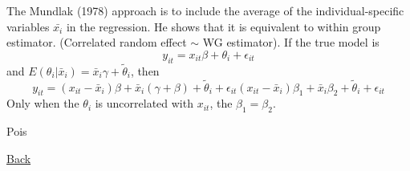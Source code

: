 
\begin{remark}
    The Mundlak (1978) approach is to include the average of the individual-specific variables $\bar{x_i}$ in the regression. He shows that it is equivalent to within group estimator.
    (Correlated random effect $\sim$ WG estimator). If the true model is \begin{equation*}
        y_{it}=x_{it}\beta+\theta_i+\epsilon_{it}
    \end{equation*} and $E(\theta_i|\bar{x}_i)=\bar{x}_i\gamma+\tilde{\theta}_i$, then
    \begin{equation*}
        y_{it}=(x_{it}-\bar{x}_i)\beta+\bar{x}_i(\gamma+\beta)+\tilde{\theta}_i+\epsilon_{it}
        (x_{it}-\bar{x}_i)\beta_1+\bar{x}_i\beta_2+\tilde{\theta}_i+\epsilon_{it}
    \end{equation*}
    Only when the $\theta_i$ is uncorrelated with $x_{it}$, the $\beta_1 = \beta_2$.
\end{remark}

\hypertarget{reg_inf_pois_2022}{Pois}

\hyperlink{home}{Back}
\bigskip

